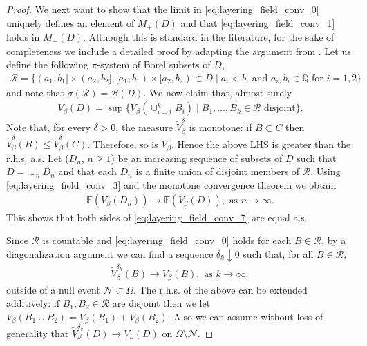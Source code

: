 \documentclass[a4paper, 11pt, reqno]{amsart}
\theoremstyle{definition} \newtheorem{defn}{Definition}[section]
\theoremstyle{remark} \newtheorem{rem}[defn]{Remark}
\theoremstyle{remark} \newtheorem*{rem*}{Remark}
\theoremstyle{plain} \newtheorem{thm}[defn]{Theorem}
\theoremstyle{plain} \newtheorem{lem}[defn]{Lemma}
\theoremstyle{plain} \newtheorem{prop}[defn]{Proposition}
\theoremstyle{plain} \newtheorem{cor}[defn]{Corollary}
\theoremstyle{remark} \newtheorem{exm}[defn]{\textbf{Example}}
\theoremstyle{remark} \newtheorem{exms}[defn]{\textbf{Examples}}
\theoremstyle{remark} \newtheorem*{bl}{}
\numberwithin{equation}{section} %
\newcommand{\mc}{\mathcal}
\newcommand{\x}{\times}
\newcommand{\Q}{\mathbb{Q}}
\newcommand{\E}{\mathbb{E}}
\begin{document}
\begin{proof}
		We next want to show that the limit in \eqref{eq:layering_field_conv_0} uniquely defines an element of $M_{+}(D)$ and that \eqref{eq:layering_field_conv_1} holds in $M_+(D)$. Although this is standard in the literature, %
        for the sake of completeness we include a detailed proof by adapting the argument from \cite[Section 6]{bersetycki17}. Let us define the following $\pi$-system of Borel subsets of $D$,
		\begin{align}
			\mc{R} = \{ (a_1, b_1] \x (a_2, b_2], [a_1, b_1) \x [a_2, b_2) \subset D \mid a_i< b_i \text{ and } a_i, b_i \in \Q \text{ for } i =1,2\} 
		\end{align} 
		and note that $\sigma(\mc{R}) = \mc{B}(D)$. We now claim that, almost surely	\begin{align}\label{eq:layering_field_conv_7}
			V_{\beta}(D) = \sup\{ V_{\beta}(\cup_{i=1}^k B_i ) \mid B_1, \ldots, B_k \in \mc{R} \text{ disjoint}\}.
		\end{align}
		Note that, for every $\delta>0$, the measure $\tilde{V}^{\delta}_{\beta}$ is monotone: if $B \subset C$ then $\tilde{V}^{\delta}_{\beta}(B) \le \tilde{V}^{\delta}_{\beta}(C)$. Therefore, so is $V_{\beta}$. Hence the above LHS is greater than the r.h.s. a.s. Let ($D_n$, $n \ge 1$) be an increasing sequence of subsets of $D$ such that $D = \cup_n D_n$ and that each $D_n$ is a finite union of disjoint members of $\mc{R}$. Using \eqref{eq:layering_field_conv_3} and the monotone convergence theorem we obtain
		\begin{align}
			\E (V_{\beta}(D_n)) \to \E (V_{\beta}(D)), \text{ as } n \to \infty.
		\end{align}
		This shows that both sides of \eqref{eq:layering_field_conv_7} are equal a.s.
		
		Since $\mc{R}$ is countable and \eqref{eq:layering_field_conv_0} holds for each $B \in \mc{R}$, by a diagonalization argument we can find a sequence $\delta_k \downarrow 0$ such that, for all $B \in \mc{R}$,
		\begin{align}\label{eq:layering_field_conv_5}
			\tilde{V}^{\delta_k}_{\beta} (B) \to V_{\beta}(B), \text{ as } k \to \infty, 
		\end{align}
		outside of a null event $\mc{N} \subset \Omega$. The r.h.s. of the above can be extended additively: if $B_1, B_2 \in \mc{R}$ are disjoint then we let $V_{\beta}(B_1\cup B_2) = V_{\beta}(B_1) + V_{\beta}(B_2)$. Also we can assume without loss of generality that $\tilde{V}^{\delta_k}_{\beta}(D) \to V_{\beta}(D)$ on $\Omega\setminus \mc{N}$. 		
		

\end{proof}
\end{document}
